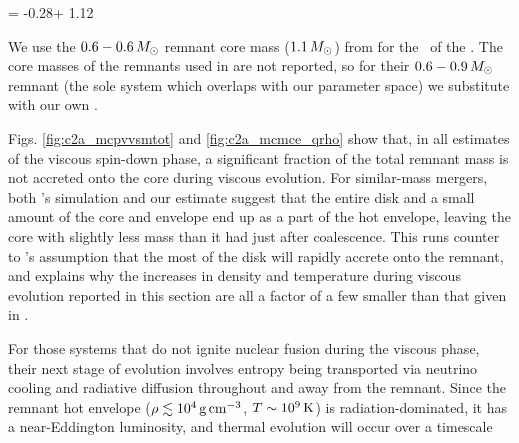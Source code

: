 \eqbegin
\frac{\Mcpv}{\Mce} = -0.28\qrho + 1.12
\label{eq:c2a_mfit}
\eqend

\noindent We use the $0.6 - 0.6\,\Msun$ remnant core mass ($1.1\,\Msun$) from \citeal{loreig09} for the \Mce\ of the \cite{ji+13}.  The core masses of the remnants used in \cite{schw+12} are not reported, so for their $0.6 - 0.9\,\Msun$ remnant (the sole system which overlaps with our parameter space) we substitute with our own \Mce.  

Figs. \ref{fig:c2a_mcpvvsmtot} and \ref{fig:c2a_mcmce_qrho} show that, in all estimates of the viscous spin-down phase, a significant fraction of the total remnant mass is not accreted onto the core during viscous evolution.  For similar-mass mergers, both \cite{ji+13}'s simulation and our estimate suggest that the entire disk and a small amount of the core and envelope end up as a part of the hot envelope, leaving the core with slightly less mass than it had just after coalescence.  This runs counter to \citeal{vkercj10}'s assumption that the most of the disk will rapidly accrete onto the remnant, and explains why the increases in density and temperature during viscous evolution reported in this section are all a factor of a few smaller than that given in \citeal{vkercj10}.




For those systems that do not ignite nuclear fusion during the viscous phase, their next stage of evolution involves entropy being transported via neutrino cooling and radiative diffusion throughout and away from the remnant.  Since the remnant hot envelope ($\rho \lesssim 10^4\,\gcc$, $T \sim 10^9\,\mathrm{K}$) is radiation-dominated, it has a near-Eddington luminosity, and thermal evolution will occur over a timescale \citep{shen+12}

